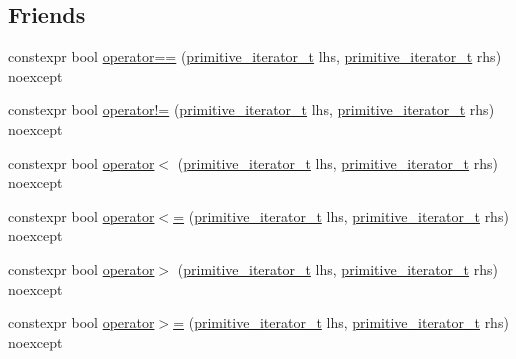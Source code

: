 \subsection*{Friends}
\begin{DoxyCompactItemize}
\item 
constexpr bool \hyperlink{classnlohmann_1_1basic__json_1_1primitive__iterator__t_aae1e1e2ec0e229d1291d69de57d76bbe}{operator==} (\hyperlink{classnlohmann_1_1basic__json_1_1primitive__iterator__t}{primitive\+\_\+iterator\+\_\+t} lhs, \hyperlink{classnlohmann_1_1basic__json_1_1primitive__iterator__t}{primitive\+\_\+iterator\+\_\+t} rhs) noexcept
\item 
constexpr bool \hyperlink{classnlohmann_1_1basic__json_1_1primitive__iterator__t_a1897889271e3fff10792d86baf1dbfdc}{operator!=} (\hyperlink{classnlohmann_1_1basic__json_1_1primitive__iterator__t}{primitive\+\_\+iterator\+\_\+t} lhs, \hyperlink{classnlohmann_1_1basic__json_1_1primitive__iterator__t}{primitive\+\_\+iterator\+\_\+t} rhs) noexcept
\item 
constexpr bool \hyperlink{classnlohmann_1_1basic__json_1_1primitive__iterator__t_a901a95e6d73c9509d3dcde914f6c8a9d}{operator$<$} (\hyperlink{classnlohmann_1_1basic__json_1_1primitive__iterator__t}{primitive\+\_\+iterator\+\_\+t} lhs, \hyperlink{classnlohmann_1_1basic__json_1_1primitive__iterator__t}{primitive\+\_\+iterator\+\_\+t} rhs) noexcept
\item 
constexpr bool \hyperlink{classnlohmann_1_1basic__json_1_1primitive__iterator__t_a7e620963ea069fd987d941c61ec4af0c}{operator$<$=} (\hyperlink{classnlohmann_1_1basic__json_1_1primitive__iterator__t}{primitive\+\_\+iterator\+\_\+t} lhs, \hyperlink{classnlohmann_1_1basic__json_1_1primitive__iterator__t}{primitive\+\_\+iterator\+\_\+t} rhs) noexcept
\item 
constexpr bool \hyperlink{classnlohmann_1_1basic__json_1_1primitive__iterator__t_a680c471188e46854d7b78a7c2a0c1122}{operator$>$} (\hyperlink{classnlohmann_1_1basic__json_1_1primitive__iterator__t}{primitive\+\_\+iterator\+\_\+t} lhs, \hyperlink{classnlohmann_1_1basic__json_1_1primitive__iterator__t}{primitive\+\_\+iterator\+\_\+t} rhs) noexcept
\item 
constexpr bool \hyperlink{classnlohmann_1_1basic__json_1_1primitive__iterator__t_aadc054c066f8d117695113ddceb8c46e}{operator$>$=} (\hyperlink{classnlohmann_1_1basic__json_1_1primitive__iterator__t}{primitive\+\_\+iterator\+\_\+t} lhs, \hyperlink{classnlohmann_1_1basic__json_1_1primitive__iterator__t}{primitive\+\_\+iterator\+\_\+t} rhs) noexcept

\end{DoxyCompactItemize}
